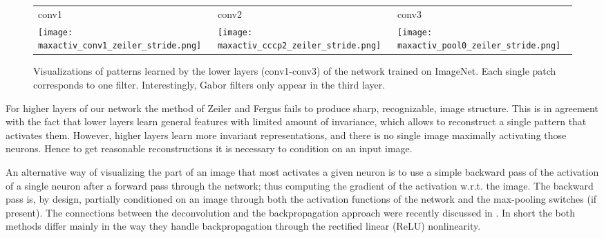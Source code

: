 \documentclass{article} \usepackage{iclr2015,times}
\begin{document}
\begin{figure}
\hspace*{-.0cm}
\begin{center}
\begin{tabular}{>{\centering\arraybackslash} m{3.3cm} >{\centering\arraybackslash} m{3.3cm} >{\centering\arraybackslash} m{4.3cm}}
  conv1 & conv2 & conv3 \\
  \texttt{[image: maxactiv\_conv1\_zeiler\_stride.png]} &
  \texttt{[image: maxactiv\_cccp2\_zeiler\_stride.png]} &
  \texttt{[image: maxactiv\_pool0\_zeiler\_stride.png]} \\
\end{tabular}
\end{center}
\vspace*{-0.2cm}
\caption{Visualizations of patterns learned by the lower layers (conv1-conv3) of the network trained on ImageNet. Each single patch corresponds to one filter. Interestingly, Gabor filters only appear in the third layer.}
\label{fig:lower_layer_reconstructions}
\vspace*{-0.2cm}
\end{figure}

For higher layers of our network the method of Zeiler and Fergus fails to produce sharp, recognizable, image structure. This is in agreement with the fact that lower layers learn general features with limited amount of invariance, which allows to reconstruct a single pattern that activates them. However, higher layers learn more invariant representations, and there is no single image maximally activating those neurons. Hence to get reasonable reconstructions it is necessary to condition on an input image.




An alternative way of visualizing the part of an image that most activates a given neuron is to use a simple backward pass of the activation of a single neuron after a forward pass through the network; thus computing the gradient of the activation w.r.t. the image. The backward pass is, by design, partially conditioned on an image through both the activation functions of the network and the max-pooling switches (if present). The connections between the deconvolution and the backpropagation approach were recently discussed in \citet{Simonyan_arxiv2014}. In short the both methods differ mainly in the way they handle backpropagation through the rectified linear (ReLU) nonlinearity.
\end{document}
